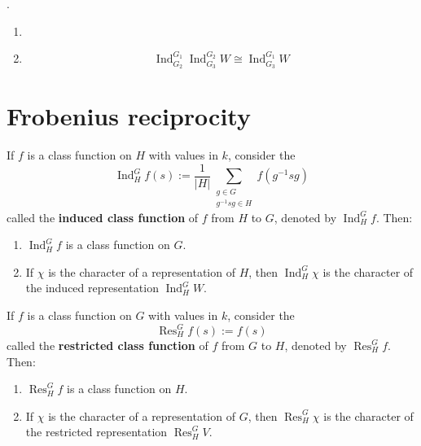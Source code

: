 \documentclass[12pt, oneside]{book}
\begin{document}
\begin{proposition}

\end{proposition}



\begin{proposition}.
    \begin{enumerate}
        \item

        \item \begin{equation*}
                  \operatorname{Ind}_{G_2}^{G_1}\operatorname{Ind}_{G_3}^{G_2} W
                  \cong
                  \operatorname{Ind}_{G_3}^{G_1} W
              \end{equation*}
    \end{enumerate}
\end{proposition}

\section{Frobenius reciprocity}
\begin{definition}
    If $f$ is a class function on $H$ with values in $k$, consider the
    \begin{equation*}
        \operatorname{Ind}_H^G  f(s)
        :=
        \frac{1}{\left|H\right|}\sum_{\substack{g\in G\\g^{-1}sg \in H}} f\left(g^{-1}sg\right)
    \end{equation*}
    called the \textbf{induced class function} of $f$ from $H$ to $G$, denoted by $\operatorname{Ind}_H^G f$.
    Then:
    \begin{enumerate}
        \item $\operatorname{Ind}_H^G f $ is a class function on $G$.
        \item If $\chi$ is the character of a representation of $H$, then $\operatorname{Ind}_H^G \chi$ is the character of the induced representation $\operatorname{Ind}_H^G W$.
    \end{enumerate}
\end{definition}

\begin{definition}
    If $f$ is a class function on $G$ with values in $k$, consider the
    \begin{equation*}
        \operatorname{Res}_H^G  f(s)
        :=
        f(s)
    \end{equation*}
    called the \textbf{restricted class function} of $f$ from $G$ to $H$, denoted by $\operatorname{Res}_H^G f$.
    Then:
    \begin{enumerate}
        \item $\operatorname{Res}_H^G f $ is a class function on $H$.
        \item If $\chi$ is the character of a representation of $G$, then $\operatorname{Res}_H^G \chi$ is the character of the restricted representation $\operatorname{Res}_H^G V$.
    \end{enumerate}
\end{definition}
\end{document}
